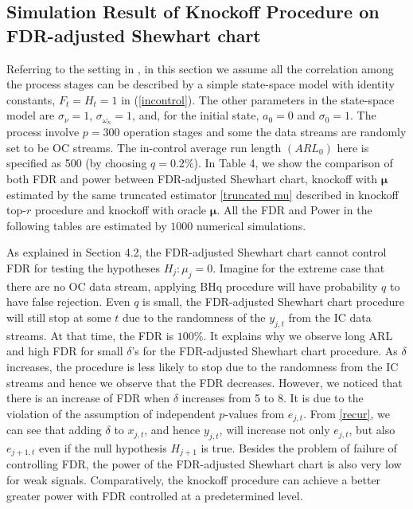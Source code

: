 \documentclass[]{interact}
\theoremstyle{plain}%
\theoremstyle{definition}
\theoremstyle{remark}
\begin{document}
\subsection{Simulation Result of Knockoff Procedure on FDR-adjusted Shewhart chart}
Referring to the setting in \cite{li2009false}, in this section we assume all the correlation among the process stages can be described by a simple state-space model with identity constants, $F_t = H_t = 1$ in (\ref{incontrol}). The other parameters in the state-space model are $\sigma_{\nu} = 1$, $\sigma_{\omega_n} = 1$, and, for the initial state, $a_0 = 0$ and $\sigma_0 = 1$. The process involve $p=300$ operation stages and some the data streams are randomly set to be OC streams. The in-control average run length $(ARL_0)$ here is specified as 500 (by choosing $q=0.2\%$). In Table 4, we show the comparison of both FDR and power between FDR-adjusted Shewhart chart, knockoff with $\bm \mu$ estimated by the same truncated estimator \eqref{truncated mu} described in knockoff top-$r$ procedure and knockoff with oracle $\bm \mu$. All the FDR and Power in the following tables are estimated by $1000$ numerical simulations.
 
As explained in Section 4.2, the FDR-adjusted Shewhart chart cannot control FDR for testing the hypotheses $H_j:\mu_j=0$. Imagine for the extreme case that there are no OC data stream, applying BHq procedure will have probability $q$ to have false rejection. Even $q$ is small, the FDR-adjusted Shewhart chart procedure will still stop at some $t$ due to the randomness of the $y_{j,t}$ from the IC data streams. At that time, the FDR is $100\%$. It explains why we observe long ARL and high FDR for small $\delta$'s for the FDR-adjusted Shewhart chart procedure. As $\delta$ increases, the procedure is less likely to stop due to the randomness from the IC streams and hence we observe that the FDR decreases. However, we noticed that there is an increase of FDR when $\delta$ increases from 5 to 8. It is due to the violation of the assumption of independent $p$-values from $e_{j,t}$. From \eqref{recur}, we can see that adding $\delta$ to $x_{j,t}$, and hence $y_{j,t}$, will increase not only $e_{j,t}$, but also $e_{j+1,t}$ even if the null hypothesis $H_{j+1}$ is true. Besides the problem of failure of controlling FDR, the power of the FDR-adjusted Shewhart chart is also very low for weak signals. Comparatively, the knockoff procedure can achieve a better greater power with FDR controlled at a predetermined level.
\end{document}
